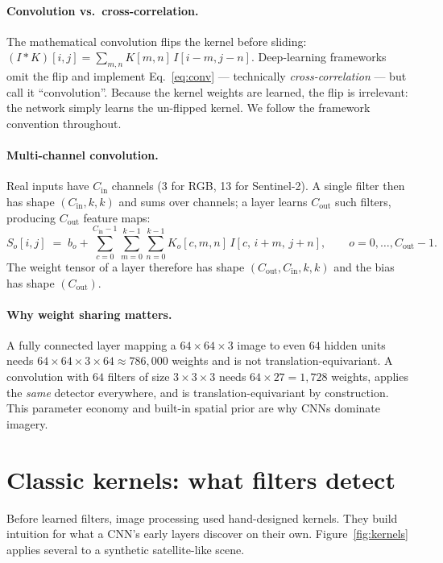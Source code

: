 \paragraph{Convolution vs.\ cross-correlation.}
The mathematical convolution flips the kernel before sliding:
$(I*K)[i,j]=\sum_{m,n}K[m,n]\,I[i-m,j-n]$. Deep-learning frameworks omit the
flip and implement Eq.~\eqref{eq:conv} --- technically \emph{cross-correlation}
--- but call it ``convolution''. Because the kernel weights are learned, the
flip is irrelevant: the network simply learns the un-flipped kernel. We follow
the framework convention throughout.

\paragraph{Multi-channel convolution.}
Real inputs have $C_\mathrm{in}$ channels (3 for RGB, 13 for Sentinel-2). A
single filter then has shape $(C_\mathrm{in},k,k)$ and sums over channels; a
layer learns $C_\mathrm{out}$ such filters, producing $C_\mathrm{out}$ feature
maps:
\begin{equation}
S_o[i,j] \;=\; b_o + \sum_{c=0}^{C_\mathrm{in}-1}\sum_{m=0}^{k-1}\sum_{n=0}^{k-1}
K_o[c,m,n]\,I[c,\,i+m,\,j+n], \qquad o = 0,\dots,C_\mathrm{out}-1.
\label{eq:convmc}
\end{equation}
The weight tensor of a layer therefore has shape
$(C_\mathrm{out},C_\mathrm{in},k,k)$ and the bias has shape $(C_\mathrm{out})$.

\paragraph{Why weight sharing matters.}
A fully connected layer mapping a $64\times64\times3$ image to even $64$
hidden units needs $64\times64\times3\times64 \approx 786{,}000$ weights and is
not translation-equivariant. A convolution with $64$ filters of size
$3\times3\times3$ needs $64\times27 = 1{,}728$ weights, applies the \emph{same}
detector everywhere, and is translation-equivariant by construction. This
parameter economy and built-in spatial prior are why CNNs dominate imagery.

\section{Classic kernels: what filters detect}

Before learned filters, image processing used hand-designed kernels. They build
intuition for what a CNN's early layers discover on their own.
Figure~\ref{fig:kernels} applies several to a synthetic satellite-like scene.

